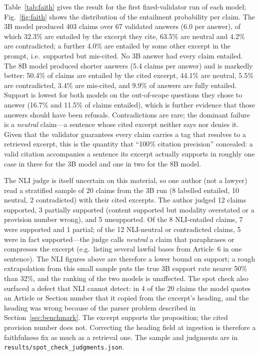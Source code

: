 Table~\ref{tab:faith} gives the result for the first fixed-validator run of each model; Fig.~\ref{fig:faith} shows the distribution of the entailment probability per claim. The 3B model produced 403 claims over 67 validated answers (6.0 per answer), of which 32.3\% are entailed by the excerpt they cite, 63.5\% are neutral and 4.2\% are contradicted; a further 4.0\% are entailed by some other excerpt in the prompt, i.e.\ supported but mis-cited. No 3B answer had every claim entailed. The 8B model produced shorter answers (5.4 claims per answer) and is markedly better: 50.4\% of claims are entailed by the cited excerpt, 44.1\% are neutral, 5.5\% are contradicted, 3.4\% are mis-cited, and 9.9\% of answers are fully entailed. Support is lowest for both models on the out-of-scope questions they chose to answer (16.7\% and 11.5\% of claims entailed), which is further evidence that those answers should have been refusals. Contradictions are rare; the dominant failure is a \emph{neutral} claim---a sentence whose cited excerpt neither says nor denies it. Given that the validator guarantees every claim carries a tag that resolves to a retrieved excerpt, this is the quantity that ``100\% citation precision'' concealed: a valid citation accompanies a sentence its excerpt actually supports in roughly one case in three for the 3B model and one in two for the 8B model.

The NLI judge is itself uncertain on this material, so one author (not a lawyer) read a stratified sample of 20 claims from the 3B run (8 labelled entailed, 10 neutral, 2 contradicted) with their cited excerpts. The author judged 12 claims supported, 3 partially supported (content supported but modality overstated or a provision number wrong), and 5 unsupported. Of the 8 NLI-entailed claims, 7 were supported and 1 partial; of the 12 NLI-neutral or contradicted claims, 5 were in fact supported---the judge calls \emph{neutral} a claim that paraphrases or compresses the excerpt (e.g.\ listing several lawful bases from Article~6 in one sentence). The NLI figures above are therefore a lower bound on support; a rough extrapolation from this small sample puts the true 3B support rate nearer 50\% than 32\%, and the ranking of the two models is unaffected. The spot check also surfaced a defect that NLI cannot detect: in 4 of the 20 claims the model quotes an Article or Section number that it copied from the excerpt's heading, and the heading was wrong because of the parser problem described in Section~\ref{sec:benchmark}. The excerpt supports the proposition; the cited provision number does not. Correcting the heading field at ingestion is therefore a faithfulness fix as much as a retrieval one. The sample and judgments are in \texttt{results/spot\_check\_judgments.json}.
